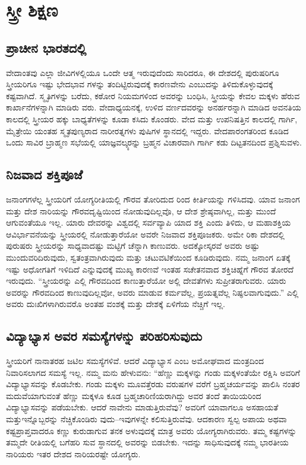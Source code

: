 
\chapter{ಸ್ತ್ರೀ ಶಿಕ್ಷಣ}

\section{ಪ್ರಾಚೀನ ಭಾರತದಲ್ಲಿ}

ವೇದಾಂತವು ಎಲ್ಲಾ ಜೀವಿಗಳಲ್ಲಿಯೂ ಒಂದೇ ಆತ್ಮ ಇರುವುದೆಂದು ಸಾರಿದರೂ, ಈ ದೇಶದಲ್ಲಿ ಪುರುಷರಿಗೂ ಸ್ತ್ರೀಯರಿಗೂ ಇಷ್ಟು ಭೇದಭಾವ ಗಳನ್ನು ತಂದಿಟ್ಟಿರುವುದಕ್ಕೆ ಕಾರಣವೇನು ಎಂಬುದನ್ನು ತಿಳಿದುಕೊಳ್ಳುವುದಕ್ಕೆ ಕಷ್ಟವಾಗಿದೆ. ಸ್ಮೃತಿಗಳನ್ನು ಬರೆದು, ಕಠೋರ ನಿಯಮಗಳಿಂದ ಅವರನ್ನು ಬಂಧಿಸಿ, ಸ್ತ್ರೀಯನ್ನು ಕೇವಲ ಮಕ್ಕಳು ಹೆರುವ ಕಾರ್ಖಾನೆಗಳನ್ನಾಗಿ ಮಾಡಿರು ವರು. ವೇದಾಧ್ಯಯನಕ್ಕೆ, ಉಳಿದ ವರ್ಣದವರನ್ನು ಅನರ್ಹರನ್ನಾಗಿ ಮಾಡಿದ ಅವನತಿಯ ಕಾಲದಲ್ಲಿ ಸ್ತ್ರೀಯರ ಹಕ್ಕು ಬಾಧ್ಯತೆಗಳನ್ನು ಕೂಡಾ ಕಸಿದು ಕೊಂಡರು. ವೇದ ಮತ್ತು ಉಪನಿಷತ್ತಿನ ಕಾಲದಲ್ಲಿ ಗಾರ್ಗಿ, ಮೈತ್ರೇಯಿ ಯಂತಹ ಸ್ಮೃತಪುಣ್ಯರಾದ ನಾರೀರತ್ನಗಳು ಪುಷಿಗಳ ಸ್ಥಾನದಲ್ಲಿ ಇದ್ದರು. ವೇದಪಾರಂಗತರಿಂದ ಕೂಡಿದ ಒಂದು ಸಾವಿರ ಬ್ರಾಹ್ಮಣ ಸಭೆಯಲ್ಲಿ ಯಾಜ್ಞವಲ್ಕ್ಯರನ್ನು ಬ್ರಹ್ಮನ ವಿಚಾರವಾಗಿ ಗಾರ್ಗಿ ಕಡು ದಿಟ್ಟತನದಿಂದ ಪ್ರಶ್ನಿಸುವಳು.


\section{ನಿಜವಾದ ಶಕ್ತಿಪೂಜೆ}

ಜನಾಂಗಗಳೆಲ್ಲ ಸ್ತ್ರೀಯರಿಗೆ ಯೋಗ್ಯರೀತಿಯಲ್ಲಿ ಗೌರವ ತೋರಿದುದ ರಿಂದ ಕೀರ್ತಿಯನ್ನು ಗಳಿಸಿದವು. ಯಾವ ಜನಾಂಗ ಮತ್ತು ದೇಶ ನಾರಿಯನ್ನು ಗೌರವದೃಷ್ಟಿಯಿಂದ ನೋಡುವುದಿಲ್ಲವೊ, ಆ ದೇಶ ಶ್ರೇಷ್ಠವಾಗಿಲ್ಲ, ಮತ್ತು ಮುಂದೆ ಆಗುವಂತೆಯೂ ಇಲ್ಲ. ಯಾರು ದೇವರನ್ನು ವಿಶ್ವದಲ್ಲಿ ಸರ್ವವ್ಯಾಪಿ ಯಾದ ಶಕ್ತಿ ಎಂದು ತಿಳಿದು, ಆ ಮಹಾಶಕ್ತಿಯ ಆವಿರ್ಭಾವನೆಯನ್ನು ಸ್ತ್ರೀಯರಲ್ಲಿ ನೋಡುತ್ತಾರೆಯೋ ಅವರೇ ನಿಜವಾದ ಶಕ್ತಿಪೂಜಕರು. ಅಮೇ ರಿಕಾ ದೇಶದಲ್ಲಿ ಪುರುಷರು ಸ್ತ್ರೀಯರನ್ನು ಸಾಧ್ಯವಾದಷ್ಟು ಮಟ್ಟಿಗೆ ಚೆನ್ನಾಗಿ ಕಾಣುವರು. ಅದಕ್ಕೋಸ್ಕರವೆ ಅವರು ಅಷ್ಟು ಮುಂದುವರಿದಿರುವುದು, ಸ್ವತಂತ್ರವಾಗಿರುವುದು ಮತ್ತು ಚಟುವಟಿಕೆಯಿಂದ ಕೂಡಿರುವುದು. ನಮ್ಮ ಜನಾಂಗ ಏತಕ್ಕೆ ಇಷ್ಟು ಅಧೋಗತಿಗೆ ಇಳಿದಿದೆ ಎನ್ನುವುದಕ್ಕೆ ಮುಖ್ಯ ಕಾರಣವೆ ಇಂತಹ ಸಚೇತನವಾದ ಶಕ್ತಿಚಿಹ್ನೆಗೆ ಗೌರವ ತೋರದೆ ಇರುವುದು. “ಸ್ತ್ರೀಯರನ್ನು ಎಲ್ಲಿ ಗೌರವದಿಂದ ಕಾಣುತ್ತಾರೆಯೋ ಅಲ್ಲಿ ದೇವತೆಗಳು ಸುಪ್ರೀತರಾಗುವರು. ಯಾರು ಅವರನ್ನು ಗೌರವದಿಂದ ಕಾಣುವುದಿಲ್ಲವೋ, ಅವರು ಮಾಡುವ ಕರ್ಮವೆಲ್ಲ, ಪ್ರಯತ್ನವೆಲ್ಲ ನಿಷ್ಫಲವಾಗುವುದು.” ಎಲ್ಲಿ ಅವರು ದುಃಖಿಗಳಾಗಿರುವರೊ ಅಂತಹ ವಂಶಕ್ಕೆ ಮತ್ತು ದೇಶಕ್ಕೆ ಏಳಿಗೆಯ ನೆಚ್ಚಿಗೆ ಇಲ್ಲ.


\section{ವಿದ್ಯಾಭ್ಯಾಸ ಅವರ ಸಮಸ್ಯೆಗಳನ್ನು ಪರಿಹರಿಸುವುದು}

ಸ್ತ್ರೀಯರಿಗೆ ನಾನಾತರಹ ಜಟಿಲ ಸಮಸ್ಯೆಗಳಿವೆ. ಆದರೆ ವಿದ್ಯಾಭ್ಯಾಸ ಎಂಬ ಅಮೋಘವಾದ ಮಂತ್ರದಿಂದ ನಿವಾರಿಸಲಾಗದ ಸಮಸ್ಯೆ ಇಲ್ಲ. ನಮ್ಮ ಮನು ಹೇಳುವನು: “ಹೆಣ್ಣು ಮಕ್ಕಳನ್ನು ಗಂಡು ಮಕ್ಕಳಂತೆಯೇ ರಕ್ಷಿಸಿ ಅವರಿಗೆ ವಿದ್ಯಾಭ್ಯಾಸವನ್ನು ಕೊಡಬೇಕು. ಗಂಡು ಮಕ್ಕಳು ಮೂವತ್ತೆರಡು ವರುಷಗಳ ವರೆಗೆ ಬ್ರಹ್ಮಚರ್ಯವನ್ನು ಪಾಲಿಸಿ ನಂತರ ಮದುವೆಯಾಗುವಂತೆ ಹೆಣ್ಣು ಮಕ್ಕಳೂ ಕೂಡ ಬ್ರಹ್ಮಚಾರಿಣಿಯರಾಗಿದ್ದು ಅವರ ತಂದೆ ತಾಯಿಯರಿಂದ ವಿದ್ಯಾಭ್ಯಾಸವನ್ನು ಪಡೆಯಬೇಕು. ಆದರೆ ನಾವೇನು ಮಾಡುತ್ತಿರುವೆವು? ಅವರಿಗೆ ಯಾವಾಗಲೂ ಅಸಹಾಯತೆ ಮತ್ತುಇನ್ನೊಬ್ಬರನ್ನು ನೆಚ್ಚಿಕೊಂಡಿರು ವುದು–ಇವುಗಳನ್ನೇ ಕಲಿಸುತ್ತಿರುವೆವು. ಆದಕಾರಣ ಸ್ವಲ್ಪ ಅಪಾಯ ಅಥವಾ ಕಷ್ಟಪ್ರಾಪ್ತವಾದರೂ ಕಣ್ಣು ಕುರುಡಾಗುವ ತನಕ ಅಳುವುದಕ್ಕೆ ಮಾತ್ರ ಅವರು ಯೋಗ್ಯರಾಗಿರುವರು. ತಮ್ಮ ಕಷ್ಟಗಳನ್ನು ತಮ್ಮದೇ ರೀತಿಯಲ್ಲಿ ಬಗೆಹರಿ ಸುವ ಸ್ಧಾನದಲ್ಲಿ ಅವರನ್ನು ಬಿಡಬೇಕು. ಇದನ್ನು ಸಾಧಿಸುವುದಕ್ಕೆ ನಮ್ಮ ಭಾರತೀಯ ನಾರಿಯರು ಇತರ ದೇಶದ ನಾರಿಯರಷ್ಟೇ ಯೋಗ್ಯರು.


